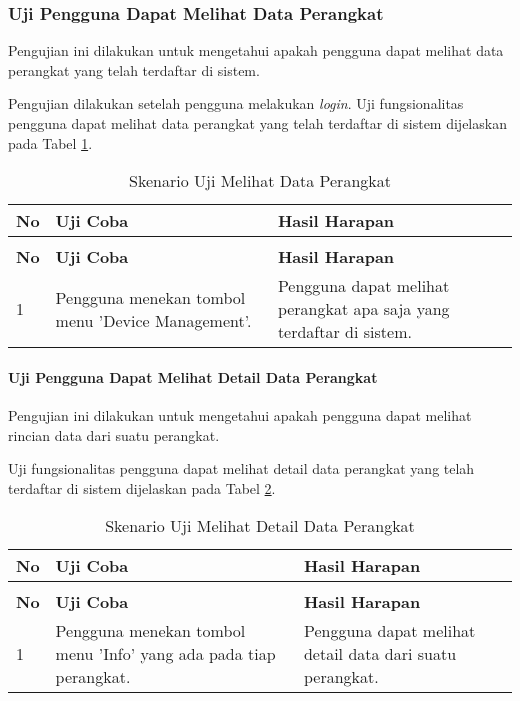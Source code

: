 \subsubsection{Uji Pengguna Dapat Melihat Data Perangkat} \label{pertama}
Pengujian ini dilakukan untuk mengetahui apakah pengguna dapat melihat data perangkat yang telah terdaftar di sistem.

Pengujian dilakukan setelah pengguna melakukan \textit{login}. Uji fungsionalitas pengguna dapat melihat data perangkat yang telah terdaftar di sistem dijelaskan pada Tabel \ref{lihatperangkat}.
\begin{longtable}{|p{}|p{}|p{}|}					\caption{Skenario Uji Pengguna Dapat Melihat Data Perangkat} \label{lihatperangkat} \\
	\hline
	\textbf{No} & \textbf{Uji Coba} & \textbf{Hasil Harapan} \\ \hline
	\endfirsthead
	\caption[]{Skenario Uji Melihat Data Perangkat} \\
	\hline
	\textbf{No} & \textbf{Uji Coba} & \textbf{Hasil Harapan} \\ \hline
	\endhead
	\endfoot
	\endlastfoot
	
	1 & Pengguna menekan tombol menu 'Device Management'. & Pengguna dapat melihat perangkat apa saja yang terdaftar di sistem.\\ \hline
\end{longtable}

\paragraph{Uji Pengguna Dapat Melihat Detail Data Perangkat} \label{kedua}
Pengujian ini dilakukan untuk mengetahui apakah pengguna dapat melihat rincian data dari suatu perangkat.

Uji fungsionalitas pengguna dapat melihat detail data perangkat yang telah terdaftar di sistem dijelaskan pada Tabel \ref{lihatdetilperangkat}.

\begin{longtable}{|p{}|p{}|p{}|}					\caption{Skenario Uji Pengguna Dapat Melihat Detail Data Perangkat} \label{lihatdetilperangkat} \\
	\hline
	\textbf{No} & \textbf{Uji Coba} & \textbf{Hasil Harapan} \\ \hline
	\endfirsthead
	\caption[]{Skenario Uji Melihat Detail Data Perangkat} \\
	\hline
	\textbf{No} & \textbf{Uji Coba} & \textbf{Hasil Harapan} \\ \hline
	\endhead
	\endfoot
	\endlastfoot
	
	1 & Pengguna menekan tombol menu 'Info' yang ada pada tiap perangkat. & Pengguna dapat melihat detail data dari suatu perangkat.\\ \hline
\end{longtable}


